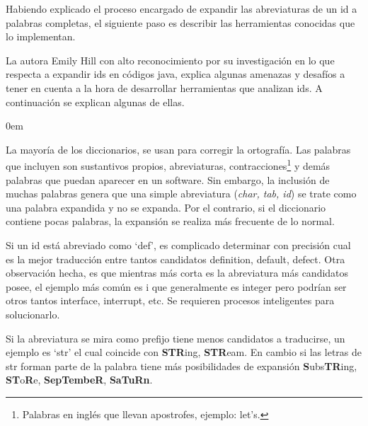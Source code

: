 Habiendo explicado el proceso encargado de expandir las abreviaturas de un id a palabras completas, el siguiente paso es describir las herramientas conocidas que lo implementan. 

La autora Emily Hill \cite{EZH08} con alto reconocimiento por su investigación en lo que respecta a expandir ids en códigos java, explica algunas amenazas y desafíos a tener en cuenta a la hora de desarrollar herramientas que analizan ids. A continuación se explican algunas de ellas.

\begin{description}
\itemsep0em%
\item[Dificultad para armar diccionarios apropiados:]  La mayoría de los diccionarios, se usan para corregir la ortografía. Las palabras que incluyen son sustantivos propios, abreviaturas, contracciones\footnote[1]{Palabras en inglés que llevan apostrofes, ejemplo: let's.} y demás palabras que puedan aparecer en un software. Sin embargo, la inclusión de muchas palabras genera que una simple abreviatura (\textit{char, tab, id}) se trate como una palabra expandida y no se expanda. Por el contrario, si el diccionario contiene pocas palabras, la expansión se realiza más frecuente de lo normal.

\item[Dificultad para traducir abreviaturas cortas:] Si un id está 
abreviado como `\textsf{def}', es complicado determinar con precisión cual es la mejor traducción entre tantos candidatos \textsf{definition, default, defect}. Otra observación hecha, es que mientras más corta es la abreviatura más candidatos posee, el ejemplo más común es \textsf{i} que generalmente es \textsf{integer} pero podrían ser otros tantos \textsf{interface, interrupt}, etc. Se requieren procesos inteligentes para solucionarlo.

\item[Distintas políticas de expansión:] Si la abreviatura se mira como prefijo tiene menos candidatos a traducirse, un ejemplo es `\textsf{str}' el cual coincide con \textbf{STR}\textsf{ing}, \textbf{STR}\textsf{eam}. En cambio si las letras de \textsf{str} forman parte de la palabra tiene más posibilidades de expansión \textbf{S}\textsf{ubs}\textbf{TR}\textsf{ing}, \textbf{ST}\textsf{o}\textbf{R}\textsf{e}, \textbf{S}\textbf{ep}\textbf{T}\textbf{embe}\textbf{R}, \textbf{S}\textbf{a}\textbf{T}\textbf{u}\textbf{R}\textbf{n}.
\end{description}

